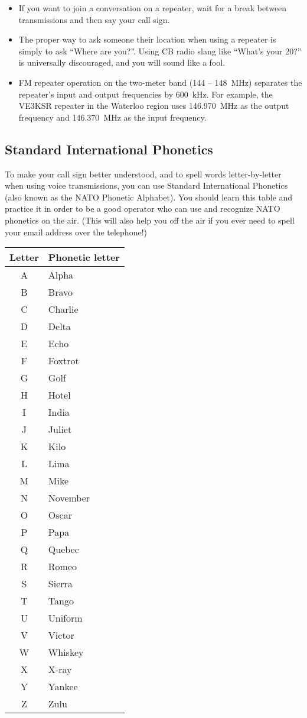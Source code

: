 \documentclass[letterpaper,12pt]{scrartcl}
\begin{document}
\begin{itemize}
\item If you want to join a conversation on a repeater, wait for a break between transmissions and then say your call sign.
\item The proper way to ask someone their location when using a repeater is simply to ask ``Where are you?''.
Using CB radio slang like ``What's your 20?'' is universally discouraged, and you will sound like a fool.
\item FM repeater operation on the two-meter band (144 -- 148~MHz) separates the repeater's input and output frequencies
by 600~kHz. For example, the VE3KSR repeater in the Waterloo region uses 146.970~MHz as the output frequency and 146.370~MHz as the input frequency.
\end{itemize}

\subsection{Standard International Phonetics}

To make your call sign better understood, and to spell words letter-by-letter when using voice transmissions,
you can use Standard International Phonetics (also known as the NATO Phonetic Alphabet).
You should learn this table and practice it in order to be a good operator who can use and recognize NATO phonetics on the air.
(This will also help you off the air if you ever need to spell your email address over the telephone!)

\begin{tabular}{c|l}
Letter & Phonetic letter \\
\hline 
A&Alpha \\
B&Bravo\\
C&Charlie\\
D&Delta\\
E&Echo\\
F&Foxtrot\\
G&Golf\\
H&Hotel\\
I&India\\
J&Juliet\\
K&Kilo\\
L&Lima\\
M&Mike\\
N&November\\
O&Oscar\\
P&Papa\\
Q&Quebec\\
R&Romeo\\
S&Sierra\\
T&Tango\\
U&Uniform\\
V&Victor\\
W&Whiskey\\
X&X-ray\\
Y&Yankee\\
Z&Zulu
\end{tabular}
\end{document}
